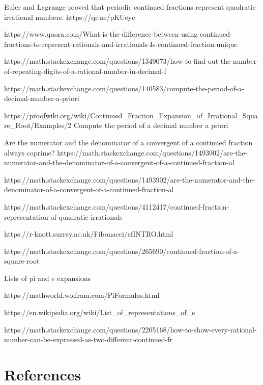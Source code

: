 \documentclass[
  a4paper,
]{article}
\begin{document}
Euler and Lagrange proved that periodic continued fractions represent
quadratic irrational numbers. https://qr.ae/pKUeyc

https://www.quora.com/What-is-the-difference-between-using-continued-fractions-to-represent-rationals-and-irrationals-Is-continued-fraction-unique

https://math.stackexchange.com/questions/1349073/how-to-find-out-the-number-of-repeating-digits-of-a-rational-number-in-decimal-f

https://math.stackexchange.com/questions/140583/compute-the-period-of-a-decimal-number-a-priori

https://proofwiki.org/wiki/Continued\_Fraction\_Expansion\_of\_Irrational\_Square\_Root/Examples/2
Compute the period of a decimal number a priori

Are the numerator and the denominator of a convergent of a continued
fraction always coprime?
https://math.stackexchange.com/questions/1493902/are-the-numerator-and-the-denominator-of-a-convergent-of-a-continued-fraction-al

https://math.stackexchange.com/questions/1493902/are-the-numerator-and-the-denominator-of-a-convergent-of-a-continued-fraction-al

https://math.stackexchange.com/questions/4112417/continued-fraction-representation-of-quadratic-irrationals

https://r-knott.surrey.ac.uk/Fibonacci/cfINTRO.html

https://math.stackexchange.com/questions/265690/continued-fraction-of-a-square-root

Lists of pi and e expansions

https://mathworld.wolfram.com/PiFormulas.html

https://en.wikipedia.org/wiki/List\_of\_representations\_of\_e

https://math.stackexchange.com/questions/2205168/how-to-show-every-rational-number-can-be-expressed-as-two-different-continued-fr

\hypertarget{bibliography}{%
\section*{References}\label{bibliography}}
\end{document}
